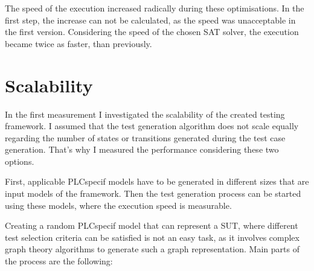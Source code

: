 The speed of the execution increased radically during these optimisations. In the first step, the increase can not be calculated, as the speed was unacceptable in the first version. Considering the speed of the chosen SAT solver, the execution became twice as faster, than previously.


\section{Scalability}
\label{sec:scalability}

In the first measurement I investigated the scalability of the created testing framework. I assumed that the test generation algorithm does not scale equally regarding the number of states or transitions generated during the test case generation. That's why I measured the performance considering these two options.

First, applicable PLCspecif models have to be generated in different sizes that are input models of the framework. Then the test generation process can be started using these models, where the execution speed is measurable.

Creating a random PLCspecif model that can represent a SUT, where different test selection criteria can be satisfied is not an easy task, as it involves complex graph theory algorithms to generate such a graph representation. Main parts of the process are the following:


